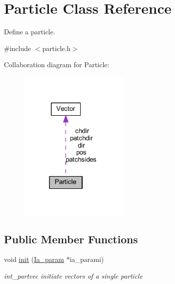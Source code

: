 \hypertarget{class_particle}{\section{Particle Class Reference}
\label{class_particle}
}


Define a particle.  




{\ttfamily \#include $<$particle.\+h$>$}



Collaboration diagram for Particle\+:\nopagebreak
\begin{figure}[H]
\begin{center}
\leavevmode
\includegraphics[width=153pt]{class_particle__coll__graph}
\end{center}
\end{figure}
\subsection*{Public Member Functions}
\begin{DoxyCompactItemize}
\item 
void \hyperlink{class_particle_a5770ca81df8dff0087a05261cea3fba0}{init} (\hyperlink{class_ia__param}{Ia\+\_\+param} $\ast$ia\+\_\+parami)
\begin{DoxyCompactList}\small\item\em int\+\_\+partvec initiate vectors of a single particle \end{DoxyCompactList}\end{DoxyCompactItemize}
